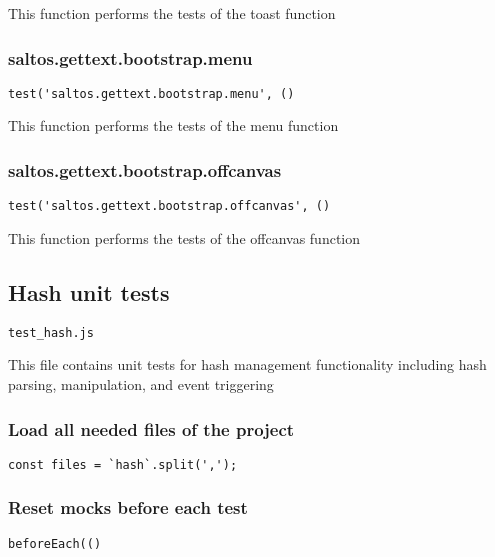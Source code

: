 \documentclass[a4paper]{article}
\begin{document}
This function performs the tests of the toast function

\hypertarget{toc623}{}
\subsubsection{saltos.gettext.bootstrap.menu}

\begin{lstlisting}
test('saltos.gettext.bootstrap.menu', ()
\end{lstlisting}

This function performs the tests of the menu function

\hypertarget{toc624}{}
\subsubsection{saltos.gettext.bootstrap.offcanvas}

\begin{lstlisting}
test('saltos.gettext.bootstrap.offcanvas', ()
\end{lstlisting}

This function performs the tests of the offcanvas function

\hypertarget{toc625}{}
\subsection{Hash unit tests}

\begin{lstlisting}
test_hash.js
\end{lstlisting}

This file contains unit tests for hash management functionality
including hash parsing, manipulation, and event triggering

\hypertarget{toc626}{}
\subsubsection{Load all needed files of the project}

\begin{lstlisting}
const files = `hash`.split(',');
\end{lstlisting}

\hypertarget{toc627}{}
\subsubsection{Reset mocks before each test}

\begin{lstlisting}
beforeEach(()
\end{lstlisting}
\end{document}
